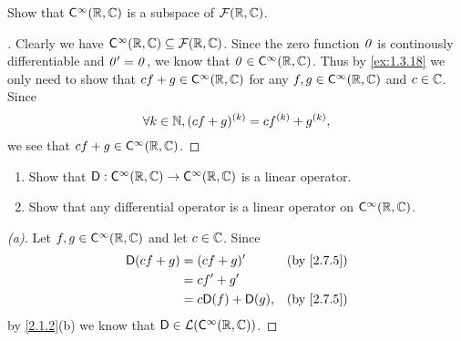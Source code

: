 \exercisesection

\setcounter{ex}{4}
\begin{ex}\label{ex:2.7.5}
  Show that \(\cfs[\infty](\R, \C)\) is a subspace of \(\mathcal{F}(\mathbb{R}, \mathbb{C})\).
\end{ex}

\begin{proof}[]
  Clearly we have \(\cfs[\infty](\R, \C) \subseteq \fs(\R, \C)\).
  Since the zero function \(\mathit{0}\) is continously differentiable and \(\mathit{0}' = \mathit{0}\), we know that \(\zv \in \cfs[\infty](\R, \C)\).
  Thus by \cref{ex:1.3.18} we only need to show that \(cf + g \in \cfs[\infty](\R, \C)\) for any \(f, g \in \cfs[\infty](\R, \C)\) and \(c \in \mathbb{C}\).
  Since
  \[
    \forall k \in \mathbb{N}, (cf + g)^{(k)} = c f^{(k)} + g^{(k)},
  \]
  we see that \(cf + g \in \cfs[\infty](\R, \C)\).
\end{proof}

\begin{ex}\label{ex:2.7.6}
  \begin{enumerate}
    \item Show that \(\Dop : \cfs[\infty](\R, \C) \to \cfs[\infty](\R, \C)\) is a linear operator.
    \item Show that any differential operator is a linear operator on \(\cfs[\infty](\R, \C)\).
  \end{enumerate}
\end{ex}

\begin{proof}[(a)]
  Let \(f, g \in \cfs[\infty](\R, \C)\) and let \(c \in \mathbb{C}\).
  Since
  \begin{align*}
    \Dop(cf + g) & = (cf + g)'            &  & \text{(by \cref{2.7.5})} \\
                 & = c f' + g'                                          \\
                 & = c \Dop(f) + \Dop(g), &  & \text{(by \cref{2.7.5})}
  \end{align*}
  by \cref{2.1.2}(b) we know that \(\Dop \in \ls(\cfs[\infty](\R, \C))\).
\end{proof}

